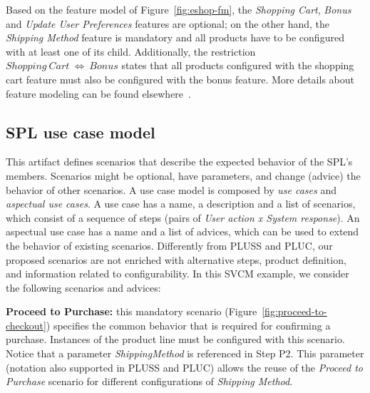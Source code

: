 \documentclass{acm_proc_article-sp}
\begin{document}
Based on the feature model of Figure~\ref{fig:eshop-fm}, the \emph{Shopping
Cart}, \emph{Bonus} and \emph{Update User Preferences} features are optional; on
the other hand, the \emph{Shipping Method} feature is mandatory and all products
have to be configured with at least one of its child. Additionally, the
restriction $Shopping\ Cart\ \Leftrightarrow\ Bonus$ states that all
products configured with the shopping cart feature must also be configured with
the bonus feature. More details about feature modeling can be found
elsewhere~\cite{Gheyi:2006aa,Czarnecki:2000aa}.


\subsection{SPL use case model}

This artifact defines scenarios that describe the expected behavior of the SPL's
members. Scenarios might be optional, have parameters, and change (advice) the
behavior of other scenarios. A use case model is composed by \emph{use cases} and
\emph{aspectual use cases}. A use case has a name, a description and a list of
scenarios, which consist of a sequence of steps (pairs of \emph{User action x
System response}). An aspectual use case has a name and a list of advices, which
can be used to extend the behavior of existing scenarios. Differently from
PLUSS and PLUC, our proposed scenarios are not enriched with alternative steps,
product definition, and information related to configurability.
In this SVCM example, we consider the following scenarios and advices:

{\bf Proceed to Purchase:} this mandatory scenario
(Figure~\ref{fig:proceed-to-checkout}) specifies the common behavior that is
required for confirming a purchase. Instances of the product line must be
configured with this scenario. Notice that a parameter
\emph{ShippingMethod} is referenced in Step P2. This parameter (notation
also supported in PLUSS and PLUC) allows the reuse of the \emph{Proceed to
Purchase} scenario for different configurations of \emph{Shipping Method}.
\end{document}
